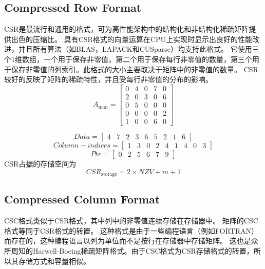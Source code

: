 \documentclass[forprint]{WHUBachelor}
\begin{document}
\subsection{Compressed Row Format}
CSR是最流行和通用的格式，可为高性能架构中的结构化和非结构化稀疏矩阵提供出色的压缩比\cite{Choi2015Design}。 具有CSR格式的向量运算在CPU上实现时显示出良好的性能改进，并且所有算法（如BLAS，LAPACK和CUSparse）均支持此格式。 它使用三个1维数组，一个用于保存非零值，第二个用于保存每行非零值的数量，第三个用于保存非零值的列索引。此格式的大小主要取决于矩阵中的非零值的数量。 CSR较好的反映了矩阵的稀疏特性，并且受每行非零值的分布的影响。
\begin {equation} 
A_{\operatorname{man}}=\left[ \begin{array}{ccccc}{0} & {4} & {0} & {7} & {0} \\ {2} & {0} & {3} & {0} & {6} \\ {0} & {5} & {0} & {0} & {0} \\ {0} & {0} & {0} & {0} & {2} \\ {1} & {0} & {0} & {6} & {0}\end{array}\right]
 \end {equation}

\begin{equation} 
Data=\left[ \begin{array}{ccccccccc}{4} & {7} & {2} & {3} & {6} & {5} & {2} & {1} & {6}\end{array}\right]
 \end{equation}
\begin{equation} 
Column-indices=\left[ \begin{array}{lllllllll}{1} & {3} & {0} & {2} & {4} & {1} & {4} & {0} & {3}\end{array}\right]
 \end{equation}
\begin{equation} 
P t r=\left[ \begin{array}{llllll}{0} & {2} & {5} & {6} & {7} & {9}\end{array}\right]
 \end{equation}
CSR占据的存储空间为
\begin{equation} 
CSR_{\text {storage}}=2 \times N Z V+m+1
 \end{equation}
\subsection{Compressed Column Format}
CSC格式类似于CSR格式，其中列中的非零值连续存储在存储器中\cite{Duff1989The}。 矩阵的CSC格式等同于CSR格式的转置。 这种格式是由于一些编程语言（例如FORTRAN）而存在的，这种编程语言以列为单位而不是按行在存储器中存储矩阵。 这也是众所周知的Harwell-Boeing稀疏矩阵格式。由于CSC格式为CSR存储格式的转置，所以其存储方式和容量相似。
\end{document}
